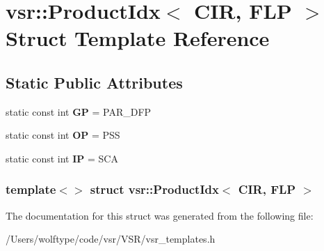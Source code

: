 \hypertarget{structvsr_1_1_product_idx_3_01_c_i_r_00_01_f_l_p_01_4}{\section{vsr\-:\-:Product\-Idx$<$ C\-I\-R, F\-L\-P $>$ Struct Template Reference}
\label{structvsr_1_1_product_idx_3_01_c_i_r_00_01_f_l_p_01_4}
}
\subsection*{Static Public Attributes}
\begin{DoxyCompactItemize}
\item 
\hypertarget{structvsr_1_1_product_idx_3_01_c_i_r_00_01_f_l_p_01_4_aaa077065001f5a0041941239f31dee24}{static const int {\bfseries G\-P} = P\-A\-R\-\_\-\-D\-F\-P}\label{structvsr_1_1_product_idx_3_01_c_i_r_00_01_f_l_p_01_4_aaa077065001f5a0041941239f31dee24}

\item 
\hypertarget{structvsr_1_1_product_idx_3_01_c_i_r_00_01_f_l_p_01_4_af984cf13252ee3178276a3807d55fae3}{static const int {\bfseries O\-P} = P\-S\-S}\label{structvsr_1_1_product_idx_3_01_c_i_r_00_01_f_l_p_01_4_af984cf13252ee3178276a3807d55fae3}

\item 
\hypertarget{structvsr_1_1_product_idx_3_01_c_i_r_00_01_f_l_p_01_4_a4d683b4e8e345e6c7a52207858ebcfe1}{static const int {\bfseries I\-P} = S\-C\-A}\label{structvsr_1_1_product_idx_3_01_c_i_r_00_01_f_l_p_01_4_a4d683b4e8e345e6c7a52207858ebcfe1}

\end{DoxyCompactItemize}
\subsubsection*{template$<$$>$ struct vsr\-::\-Product\-Idx$<$ C\-I\-R, F\-L\-P $>$}



The documentation for this struct was generated from the following file\-:\begin{DoxyCompactItemize}
\item 
/\-Users/wolftype/code/vsr/\-V\-S\-R/vsr\-\_\-templates.\-h\end{DoxyCompactItemize}
